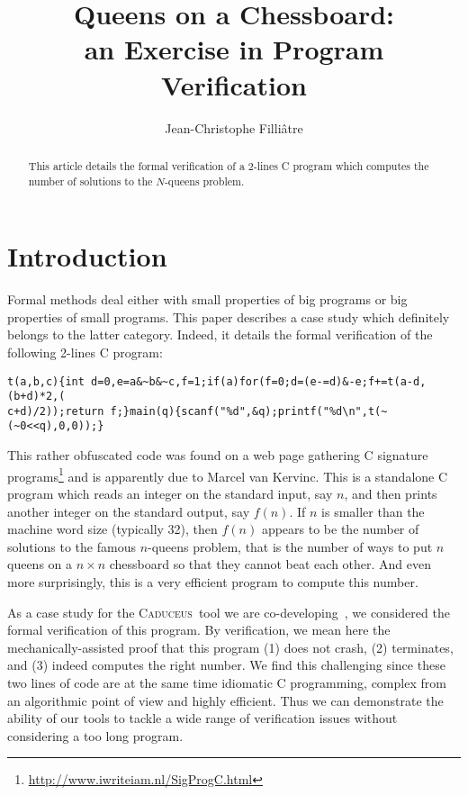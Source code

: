 \documentclass[a4paper]{llncs}
\newcommand{\caduceus}{\textsc{Caduceus}}
\begin{document}
\title{Queens on a Chessboard: \\
       an Exercise in Program Verification}
\author{Jean-Christophe Filli\^atre}
\maketitle

\begin{abstract}
  This article details the formal verification of a 2-lines C program
  which computes the number of solutions to the $N$-queens problem.
\end{abstract}

\section{Introduction}

Formal methods deal either with small properties of big programs or
big properties of small programs. This paper describes a case study
which definitely belongs to the latter category.
Indeed, it details the formal verification of the following 2-lines C program:
{\small\begin{verbatim}
t(a,b,c){int d=0,e=a&~b&~c,f=1;if(a)for(f=0;d=(e-=d)&-e;f+=t(a-d,(b+d)*2,(
c+d)/2));return f;}main(q){scanf("%d",&q);printf("%d\n",t(~(~0<<q),0,0));}
\end{verbatim}}
\noindent 
This rather obfuscated code was found on a web page gathering C signature
programs\footnote{\url{http://www.iwriteiam.nl/SigProgC.html}} and is
apparently due to Marcel van Kervinc. This is a standalone C program
which reads an integer on the standard input, say $n$, and then prints another
integer on the standard output, say $f(n)$. If $n$ is smaller than the
machine word size (typically 32), then
$f(n)$ appears to be the number of solutions to the famous $n$-queens
problem, that is the number of ways to put $n$ queens on a $n\times n$
chessboard so that they cannot beat each other. And even more
surprisingly, this is a very efficient program to compute this number.

As a case study for the \caduceus\ tool we are
co-developing~\cite{caduceus}, we considered 
the formal verification of this program. By verification, we mean here
the mechanically-assisted proof that this program (1) does not crash, 
(2) terminates, and (3) indeed computes the right number. We find this
challenging since these two lines of code are at the same time idiomatic C
programming, complex from an algorithmic point of view and highly
efficient. Thus we can demonstrate the ability of our tools to tackle
a wide range of verification issues without considering a too long
program. 
\end{document}
